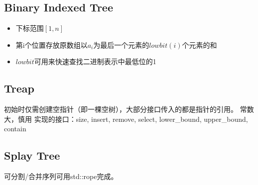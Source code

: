 	\subsection{Binary Indexed Tree}
		\begin{flushleft}
			\begin{itemize}
				\item 下标范围$[1, n]$
				\item 第i个位置存放原数组以$a_{i}$为最后一个元素的$lowbit(i)$个元素的和
				\item $lowbit$可用来快速查找二进制表示中最低位的1
			\end{itemize}
		\end{flushleft}
		
	\newpage
	\subsection{Treap}
		\begin{flushleft}
			初始时仅需创建空指针（即一棵空树），大部分接口传入的都是指针的引用。
			\linebreak 常数大，慎用
			\linebreak 实现的接口：size, insert, remove, select, lower\_bound, upper\_bound, contain
		\end{flushleft}
		
	\newpage
	\subsection{Splay Tree}
		\begin{flushleft}
			可分割/合并序列可用std::rope完成。
		\end{flushleft}
		
